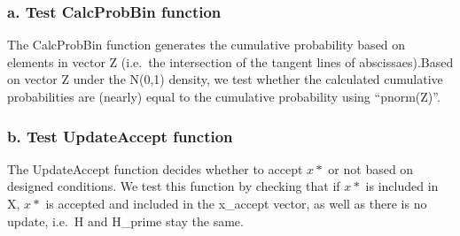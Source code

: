 \documentclass[]{article}
\begin{document}
\subsubsection{a. Test CalcProbBin
function}\label{a.-test-calcprobbin-function}

The CalcProbBin function generates the cumulative probability based on
elements in vector Z (i.e.~the intersection of the tangent lines of
abscissaes).Based on vector Z under the N(0,1) density, we test whether
the calculated cumulative probabilities are (nearly) equal to the
cumulative probability using ``pnorm(Z)''.

\subsubsection{b. Test UpdateAccept
function}\label{b.-test-updateaccept-function}

The UpdateAccept function decides whether to accept \(x*\) or not based
on designed conditions. We test this function by checking that if \(x*\)
is included in X, \(x*\) is accepted and included in the x\_accept
vector, as well as there is no update, i.e.~H and H\_prime stay the
same.
\end{document}

